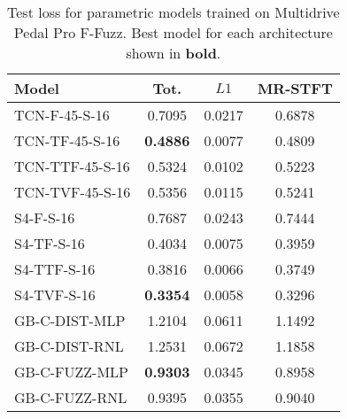 \setlength{\tabcolsep}{6pt}
\renewcommand{\arraystretch}{1.0}
\setcounter{table}{2}
\begin{table}[]
    \small
    \caption{Test loss for parametric models trained on Multidrive Pedal Pro F-Fuzz. Best model for each architecture shown in \textbf{bold}.}
    \label{tab:results}
    \centering
    \begin{tabular}{l>{\columncolor{gray!20}}ccc}
        \hline
        \hline
        Model
        & Tot. & \footnotesize{$L1$} & \footnotesize{MR-STFT}\\ 
        
        \hline
        TCN-F-45-S-16 & 0.7095 & 0.0217 & 0.6878\\
        TCN-TF-45-S-16 & \textbf{0.4886} & 0.0077 & 0.4809\\
        TCN-TTF-45-S-16 & 0.5324 & 0.0102 & 0.5223\\
        TCN-TVF-45-S-16 & 0.5356 & 0.0115 & 0.5241\\
        \hline
        S4-F-S-16 & 0.7687 & 0.0243 & 0.7444\\
        S4-TF-S-16 & 0.4034 & 0.0075 & 0.3959\\
        S4-TTF-S-16 & 0.3816 & 0.0066 & 0.3749\\
        S4-TVF-S-16 & \textbf{0.3354} & 0.0058 & 0.3296\\
        \hline
        GB-C-DIST-MLP & 1.2104 & 0.0611 & 1.1492\\
        GB-C-DIST-RNL & 1.2531 & 0.0672 & 1.1858\\
        GB-C-FUZZ-MLP & \textbf{0.9303} & 0.0345 & 0.8958\\
        GB-C-FUZZ-RNL & 0.9395 & 0.0355 & 0.9040\\
        \hline
        \hline
    \end{tabular}
\end{table}